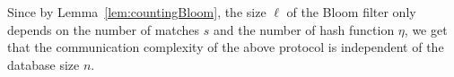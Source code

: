 Since by Lemma~\ref{lem:countingBloom}, the size $\ell$ of the Bloom
filter only depends on the number of matches $s$ and the number of hash
function $\eta$, we get that the communication complexity of the above
protocol is independent of the database size $n$. 





